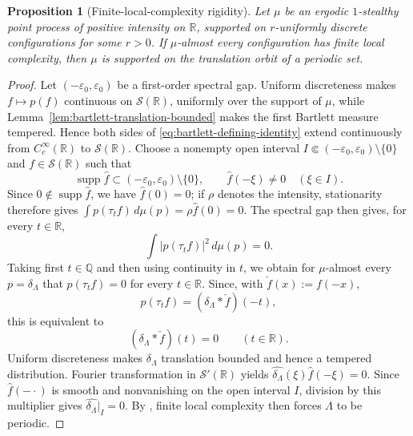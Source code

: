 \documentclass[11pt,reqno,a4paper]{amsart}
\numberwithin{equation}{section}
\theoremstyle{compact}
\newtheorem{proposition}[proposition]{Proposition}
\theoremstyle{definition}
\theoremstyle{definition}
\begin{document}
\begin{proposition}[Finite-local-complexity rigidity]
\label{prop:flc-first-order-periodic}
Let $\mu$ be an ergodic $1$-stealthy point process of positive
intensity on $\mathbb R$, supported on $r$-uniformly discrete
configurations for some $r>0$.  If $\mu$-almost every configuration has
finite local complexity, then $\mu$ is supported on the translation orbit
of a periodic set.
\end{proposition}

\begin{proof}
Let $(-\varepsilon_0,\varepsilon_0)$ be a first-order spectral gap.  Uniform
discreteness makes $f\mapsto p(f)$ continuous on $\mathcal S(\mathbb R)$,
uniformly over the support of $\mu$, while
Lemma~\ref{lem:bartlett-translation-bounded} makes the first Bartlett measure
tempered.  Hence both sides of \eqref{eq:bartlett-defining-identity} extend
continuously from $C_c^\infty(\mathbb R)$ to $\mathcal S(\mathbb R)$.
Choose a nonempty open
interval $I\Subset(-\varepsilon_0,\varepsilon_0)\setminus\{0\}$ and
$f\in\mathcal S(\mathbb R)$ such that
\[
  \operatorname{supp}\widehat f
  \subset(-\varepsilon_0,\varepsilon_0)\setminus\{0\},
  \qquad \widehat f(-\xi)\neq0\quad(\xi\in I).
\]
Since $0\notin\operatorname{supp}\widehat f$, we have
$\widehat f(0)=0$; if $\rho$ denotes the intensity, stationarity therefore gives
$\int p(\tau_t f)\,d\mu(p)=\rho\widehat f(0)=0$.  The spectral gap then gives,
for every $t\in\mathbb R$,
\[
  \int |p(\tau_t f)|^2\,d\mu(p)=0.
\]
Taking first $t\in\mathbb Q$ and then
using continuity in $t$, we obtain for $\mu$-almost every
$p=\delta_\Lambda$ that $p(\tau_t f)=0$ for every $t\in\mathbb R$.
Since, with $\check f(x):=f(-x)$,
\[
  p(\tau_t f)=(\delta_\Lambda*\check f)(-t),
\]
this is equivalent to
\[
  (\delta_\Lambda*\check f)(t)=0\qquad(t\in\mathbb R).
\]
Uniform discreteness makes $\delta_\Lambda$ translation bounded and hence a
tempered distribution.  Fourier transformation in $\mathcal S'(\mathbb R)$
yields
$\widehat{\delta_\Lambda}(\xi)\widehat f(-\xi)=0$.  Since
$\widehat f(-\cdot)$ is smooth and nonvanishing on the open interval $I$,
division by this multiplier gives $\widehat{\delta_\Lambda}|_I=0$.  By
\cite[Theorem~5.1]{KL16}, finite local complexity then forces $\Lambda$ to be
periodic.


\end{proof}
\end{document}
